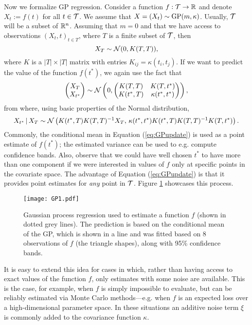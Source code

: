 Now we formalize GP regression. Consider a function $f: \mathcal{T} \to \mathbb{R}$ and denote $X_t := f(t)$ for all $t \in \mathcal{T}$. We assume that $X = (X_t) \sim \mathrm{GP} (m, \kappa)$. Usually, $\mathcal{T}$ will be a subset of $\mathbb{R}^n$. Assuming that $m = 0$ and that we have access to observations $(X_t, t)_{t \in T}$, where $T$ is a finite subset of $\mathcal{T}$, then
\begin{equation*}
	X_T \sim \mathcal{N} (0, K(T, T)),
\end{equation*}
where $K$ is a $|T| \times |T|$ matrix with entries $K_{ij} = \kappa(t_i, t_j)$. If we want to predict the value of the function $f(t^{*})$, we again use the fact that
\begin{equation*}
	\begin{pmatrix} X_T \\ X_{t^{*}} \end{pmatrix} \sim \mathcal{N} \left( 0, \begin{pmatrix} K(T, T) & K(T, t^{*}) \\ K(t^{*}, T) & \kappa(t^{*}, t^{*}) \end{pmatrix} \right),
\end{equation*}
from where, using basic properties of the Normal distribution,
\begin{equation} \label{eq:GPupdate}
	X_{t^{*}} \, | \, X_T \sim \mathcal{N} \left( K(t^{*}, T) K(T, T)^{-1} X_T, \, \kappa(t^{*}, t^{*}) K(t^{*}, T) K(T, T)^{-1} K(T, t^{*})  \right).
\end{equation}
Commonly, the conditional mean in Equation (\ref{eq:GPupdate}) is used as a point estimate of $f(t^{*})$; the estimated variance can be used to e.g. compute confidence bands. Also, observe that we could have well chosen $t^{*}$ to have more than one component if we were interested in values of $f$ only at specific points in the covariate space. The advantage of Equation (\ref{eq:GPupdate}) is that it provides point estimates for \textit{any} point in $\mathcal{T}$. Figure \ref{fig:GP1} showcases this process. \\




\begin{figure}[h]
	\centering
	\texttt{[image: GP1.pdf]}
	\caption{Gaussian process regression used to estimate a function $f$ (shown in dotted grey lines). The prediction is based on the conditional mean of the GP, which is shown in a line and was fitted based on 8 observations of $f$ (the triangle shapes), along with 95\% confidence bands.}
	\label{fig:GP1}
\end{figure}



It is easy to extend this idea for cases in which, rather than having access to exact values of the function $f$, only estimates with some noise are available. This is the case, for example, when $f$ is simply impossible to evaluate, but can be reliably estimated via Monte Carlo methods---e.g. when $f$ is an expected loss over a high-dimensional parameter space. In these situations an additive noise term $\xi$ is commonly added to the covariance function $\kappa$.



